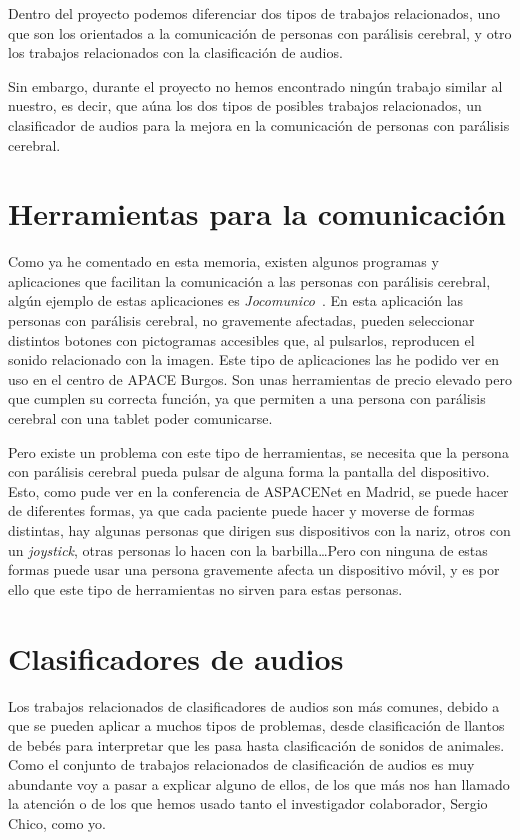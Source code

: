 
Dentro del proyecto podemos diferenciar dos tipos de trabajos relacionados, uno que son los orientados a la comunicación de personas con parálisis cerebral, y otro los trabajos relacionados con la clasificación de audios.

Sin embargo, durante el proyecto no hemos encontrado ningún trabajo similar al nuestro, es decir, que aúna los dos tipos de posibles trabajos relacionados, un clasificador de audios para la mejora en la comunicación de personas con parálisis cerebral.

\section{Herramientas para la comunicación}
Como ya he comentado en esta memoria, existen algunos programas y aplicaciones que facilitan la comunicación a las personas con parálisis cerebral, algún ejemplo de estas aplicaciones es \textit{Jocomunico}~\cite{jocomunico}. En esta aplicación las personas con parálisis cerebral, no gravemente afectadas, pueden seleccionar distintos botones con pictogramas accesibles que, al pulsarlos, reproducen el sonido relacionado con la imagen. Este tipo de aplicaciones las he podido ver en uso en el centro de APACE Burgos. Son unas herramientas de precio elevado pero que cumplen su correcta función, ya que permiten a una persona con parálisis cerebral con una tablet poder comunicarse.

Pero existe un problema con este tipo de herramientas, se necesita que la persona con parálisis cerebral pueda pulsar de alguna forma la pantalla del dispositivo. Esto, como pude ver en la conferencia de ASPACENet en Madrid, se puede hacer de diferentes formas, ya que cada paciente puede hacer y moverse de formas distintas, hay algunas personas que dirigen sus dispositivos con la nariz, otros con un \textit{joystick}, otras personas lo hacen con la barbilla\ldots Pero con ninguna de estas formas puede usar una persona gravemente afecta un dispositivo móvil, y es por ello que este tipo de herramientas no sirven para estas personas.

\section{Clasificadores de audios}
Los trabajos relacionados de clasificadores de audios son más comunes, debido a que se pueden aplicar a muchos tipos de problemas, desde clasificación de llantos de bebés para interpretar que les pasa hasta clasificación de sonidos de animales. Como el conjunto de trabajos relacionados de clasificación de audios es muy abundante voy a pasar a explicar alguno de ellos, de los que más nos han llamado la atención o de los que hemos usado tanto el investigador colaborador, Sergio Chico, como yo.

